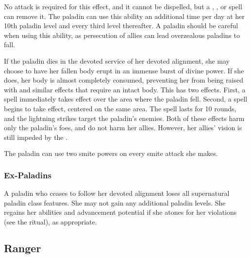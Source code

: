 No attack is required for this effect, and it cannot be dispelled, but a , , or  spell can remove it. The paladin can use this ability an additional time per day at her 10th paladin level and every third level thereafter. A paladin should be careful when using this ability, as persecution of allies can lead overzealous paladins to fall.

 If the paladin dies in the devoted service of her devoted alignment, she may choose to have her fallen body erupt in an immense burst of divine power. If she does, her body is almost completely consumed, preventing her from being raised with  and similar effects that require an intact body. This has two effects. First, a  spell immediately takes effect over the area where the paladin fell. Second, a  spell begins to take effect, centered on the same area. The spell lasts for 10 rounds, and the lightning strikes target the paladin's enemies. Both of these effects harm only the paladin's foes, and do not harm her allies. However, her allies' vision is still impeded by the .

 The paladin can use two smite powers on every smite attack she makes.

\subsubsection{Ex-Paladins}
A paladin who ceases to follow her devoted alignment loses all supernatural paladin class features. She may not gain any additional paladin levels. She regains her abilities and advancement potential if she atones for her violations (see the  ritual), as appropriate.

\subsection{Ranger}

